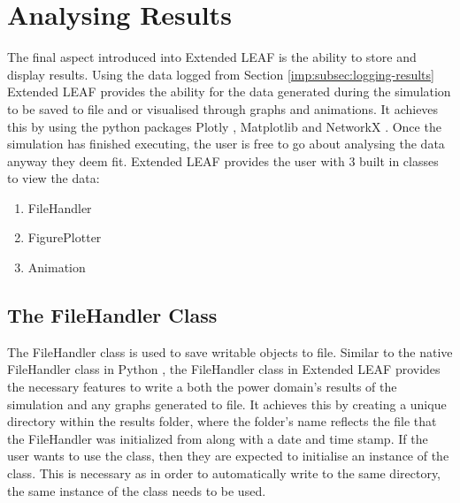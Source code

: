 \documentclass{l4proj}
\begin{document}
\section{Analysing Results}\label{sec:displaying-results}
The final aspect introduced into Extended LEAF is the ability to store and display results.
Using the data logged from Section \ref{imp:subsec:logging-results} Extended LEAF provides the ability for the data generated during the simulation to be saved to file and or visualised through graphs and animations.
It achieves this by using the python packages Plotly \citep{plotly-git}, Matplotlib \citep{Hunter:2007} and NetworkX \citep{networkx}.
Once the simulation has finished executing, the user is free to go about analysing the data anyway they deem fit.
Extended LEAF provides the user with 3 built in classes to view the data:

\begin{enumerate}
    \item FileHandler
    \item FigurePlotter
    \item Animation
\end{enumerate}

\subsection{The FileHandler Class}\label{subsec:imp:filehandler}
The FileHandler class is used to save writable objects to file.
Similar to the native FileHandler class in Python \citep{python-docs-FileHandler}, the FileHandler class in Extended LEAF provides the necessary features to write a both the power domain's results of the simulation and any graphs generated to file.
It achieves this by creating a unique directory within the results folder, where the folder's name reflects the file that the FileHandler was initialized from along with a date and time stamp.
If the user wants to use the class, then they are expected to initialise an instance of the class.
This is necessary as in order to automatically write to the same directory, the same instance of the class needs to be used.
\end{document}
